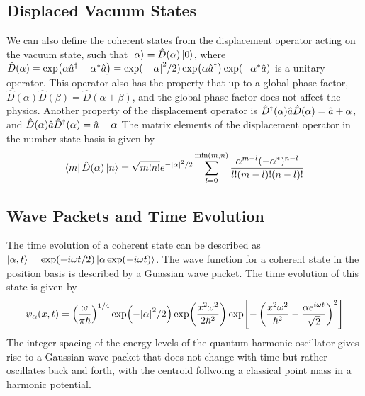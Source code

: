 \subsection{Displaced Vacuum States}
We can also define the coherent states from the displacement operator acting on the vacuum state, such that $\ket{\alpha} = \hat D(\alpha)\ket{0}$, where $\hat D (\alpha) = \exp(\alpha \hat{a}^\dagger - \alpha^*\hat{a}) = \mathrm{exp} (-\abs{\alpha}^2/2) \exp(\alpha\hat{a}^\dagger) \exp(-\alpha^*\hat{a})$ is a unitary operator. This operator also has the property that up to a global phase factor, $\hat{D}(\alpha)\hat{D}(\beta) = \hat{D}(\alpha + \beta)$, and the global phase factor does not affect the physics. Another property of the displacement operator is $\hat D^\dagger(\alpha) \hat{a} \hat D(\alpha) = \hat{a} + \alpha$, and $\hat D(\alpha) \hat{a} \hat D^\dagger(\alpha) = \hat{a} - \alpha$ The matrix elements of the displacement operator in the number state basis is given by
\begin{equation}
    \bra{m} \hat{D}(\alpha) \ket{n} = \sqrt{m!n!} e^{-\abs{\alpha}^2/2} \sum_{l=0}^{\min(m,n)} \frac{\alpha^{m-l} (-\alpha^*)^{n-l}}{l!(m-l)!(n-l)!}
\end{equation}

\subsection{Wave Packets and Time Evolution}
The time evolution of a coherent state can be described as $\ket{\alpha, t} = \exp(-i\omega t /2)\ket{\alpha \exp(-i\omega t)}$. The wave function for a coherent state in the position basis is described by a Guassian wave packet. The time evolution of this state is given by
\begin{equation}
    \psi_\alpha(x,t) = \left( \frac{\omega}{\pi \hbar} \right)^{1/4} \exp(-\abs{\alpha}^2/2) \exp(\frac{x^2\omega^2}{2\hbar^2 }) \exp[-\left( \frac{x^2\omega^2}{\hbar^2} - \frac{\alpha e^{i\omega t}}{\sqrt{2}} \right)^2]
\end{equation}
The integer spacing of the energy levels of the quantum harmonic oscillator gives rise to a Gaussian wave packet that does not change with time but rather oscillates back and forth, with the centroid follwoing a classical point mass in a harmonic potential. 

